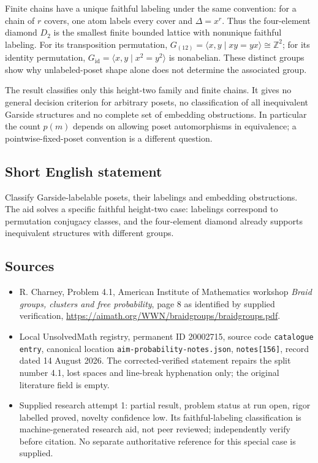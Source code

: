 \documentclass[11pt]{article}
\newcommand{\Z}{\mathbb{Z}}
\begin{document}
Finite chains have a unique faithful labeling under the same convention: for a chain of $r$ covers, one atom labels every cover and $\Delta=x^r$. Thus the four-element diamond $D_2$ is the smallest finite bounded lattice with nonunique faithful labeling. For its transposition permutation, $G_{(12)}=\langle x,y\mid xy=yx\rangle\cong\Z^2$; for its identity permutation, $G_{\mathrm{id}}=\langle x,y\mid x^2=y^2\rangle$ is nonabelian. These distinct groups show why unlabeled-poset shape alone does not determine the associated group.

The result classifies only this height-two family and finite chains. It gives no general decision criterion for arbitrary posets, no classification of all inequivalent Garside structures and no complete set of embedding obstructions. In particular the count $p(m)$ depends on allowing poset automorphisms in equivalence; a pointwise-fixed-poset convention is a different question.
\subsection{Short English statement}
Classify Garside-labelable posets, their labelings and embedding obstructions. The aid solves a specific faithful height-two case: labelings correspond to permutation conjugacy classes, and the four-element diamond already supports inequivalent structures with different groups.
\subsection{Sources}
\begin{itemize}
\item R. Charney, Problem 4.1, American Institute of Mathematics workshop \emph{Braid groups, clusters and free probability}, page 8 as identified by supplied verification, \url{https://aimath.org/WWN/braidgroups/braidgroups.pdf}.
\item Local UnsolvedMath registry, permanent ID 20002715, source code \texttt{catalogue entry}, canonical location \texttt{aim-probability-notes.json}, \texttt{notes[156]}, record dated 14 August 2026. The corrected-verified statement repairs the split number 4.1, lost spaces and line-break hyphenation only; the original literature field is empty.
\item Supplied research attempt 1: partial result, problem status at run open, rigor labelled proved, novelty confidence low. Its faithful-labeling classification is machine-generated research aid, not peer reviewed; independently verify before citation. No separate authoritative reference for this special case is supplied.
\end{itemize}
\end{document}
